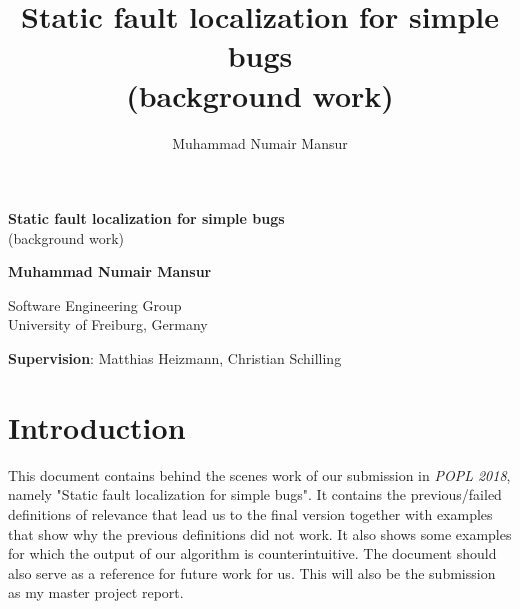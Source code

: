 \documentclass{article}
\title{Static fault localization for simple bugs \\ \normalsize{(background work)}}
\author{Muhammad Numair Mansur}
\affil{University of Freiburg, Germany}
\date{\vspace{-5ex}}
\begin{document}
\begin{titlepage}
    \begin{center}
        \vspace*{1cm}
        \Large
        \textbf{Static fault localization for simple bugs} \\
        \large
        (background work)
        \vspace{0.5cm}
   
        
        \vspace{5cm}
        \large
        \textbf{Muhammad Numair Mansur}
                
        \vspace{0.5cm}
        
        
        Software Engineering Group\\
        University of Freiburg, Germany
        
    \end{center}
    \vspace{8cm}
    \textbf{Supervision}: Matthias Heizmann, Christian Schilling
\end{titlepage}
\section{Introduction}
This document contains behind the scenes work of our submission in \textit{POPL 2018}, namely "Static fault localization for simple bugs". It contains the previous/failed definitions of relevance that lead us to the final version together with examples that show why the previous definitions did not work. It also shows some examples for which the output of our algorithm is counterintuitive. The document should also serve as  a reference for future work for us. This will also be the submission as my master project report.
\end{document}
